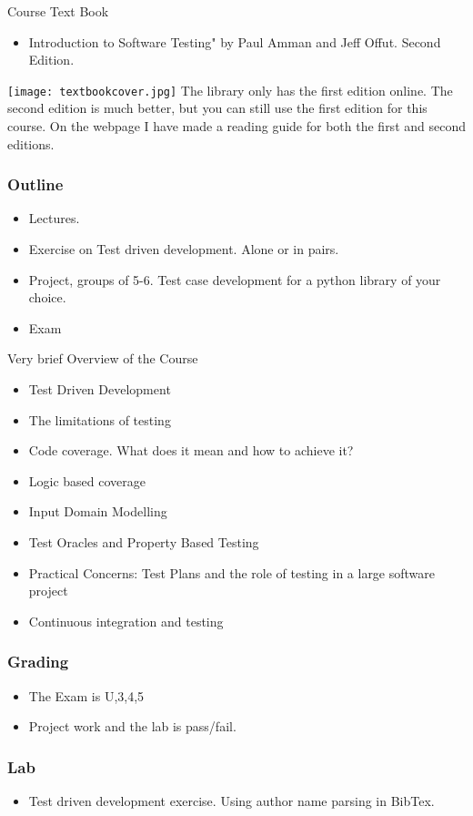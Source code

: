 \documentclass{beamer}
\begin{document}
\begin{frame}{Course Text Book}
  \begin{itemize}
  \item Introduction to Software Testing" by Paul Amman and Jeff
    Offut. Second Edition. 
  \end{itemize}
  \texttt{[image: textbookcover.jpg]} The library only has the first
  edition online. The second edition is much better, but you can still
  use the first edition for this course. On the webpage I have made a
  reading guide for both the first and second editions.
\end{frame}
\begin{frame}
  \frametitle{Outline}
  \begin{itemize}
  \item Lectures.
  \item Exercise on Test driven development. Alone or in pairs.
  \item Project, groups of 5-6. Test case development for a python
    library of your choice.
  \item Exam
  \end{itemize}
\end{frame}
\begin{frame}{Very brief Overview of the Course}
  \begin{itemize}
  \item Test Driven Development
  \item The limitations of testing
  \item Code coverage. What does it mean and how to achieve it?
  \item Logic based coverage
  \item Input Domain Modelling
  \item Test Oracles and Property Based Testing
  \item Practical Concerns: Test Plans and the role of testing in a
    large software project
  \item Continuous integration and testing 
  \end{itemize}
\end{frame}
\begin{frame}
  \frametitle{Grading}
  \begin{itemize}
  \item The Exam is U,3,4,5
  \item Project work and the lab is pass/fail.
  \end{itemize}
\end{frame}
\begin{frame}
  \frametitle{Lab}
  \begin{itemize}
  \item Test driven development exercise. Using author name parsing in
    BibTex. 
  \end{itemize}
\end{frame}
\end{document}
